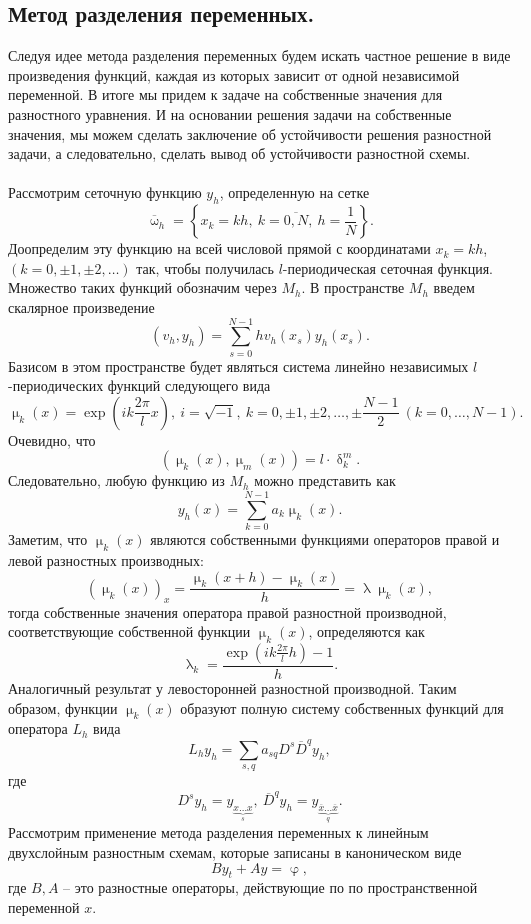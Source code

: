 \documentclass[a4paper, 12pt]{report}
\numberwithin{equation}{section}
\newcommand{\ol}{\overline}
\renewcommand{\delta}{\updelta}
\renewcommand{\varphi}{\upvarphi}
\renewcommand{\lambda}{\uplambda}
\renewcommand{\mu}{\upmu}
\renewcommand{\omega}{\upomega}
\begin{document}
 \subsection{Метод разделения переменных.}
 Следуя идее метода разделения переменных будем искать частное решение в виде произведения функций, каждая из которых зависит от одной независимой переменной. В итоге мы придем к задаче на собственные значения для разностного уравнения. И на основании решения задачи на собственные значения, мы можем сделать заключение об устойчивости решения разностной задачи, а следовательно, сделать вывод об устойчивости разностной схемы.\\\\
 Рассмотрим сеточную функцию $y_h$, определенную на сетке $$\ol \omega _h = \left\{x_k = kh,\ k = \ol{0,N},\ h = \dfrac 1N\right\}.$$
 Доопределим эту функцию на всей числовой прямой с координатами $x_k = kh$, $(k = 0, \pm 1, \pm 2,\ldots)$ так, чтобы получилась $l$-периодическая сеточная функция. Множество таких функций обозначим через $M_h$. В пространстве $M_h$ введем скалярное произведение
 $$(v_h, y_h) = \sum_{s=0}^{N-1} h v_h(x_s) y_h(x_s).$$
 Базисом в этом пространстве будет являться система линейно независимых $l$-периодических функций следующего вида
 $$\mu_k(x)=\exp\left(ik \frac {2\pi}lx\right),\ i = \sqrt{-1},\ k=0,\pm1,\pm2,\ldots,\pm \dfrac {N-1}{2}\ (k=0,\ldots,N-1).$$
 Очевидно, что $$(\mu_k(x), \mu_m(x)) = l\cdot \delta ^m_k.$$
 Следовательно, любую функцию из $M_h$ можно представить как
 $$y_h(x) = \sum_{k=0}^{N-1} a_k \mu_k(x).$$
 Заметим, что $\mu_k(x)$ являются собственными функциями операторов правой и левой разностных производных:
 $$(\mu_k(x))_x = \dfrac{\mu_k(x+h) - \mu_k(x)}{h} = \lambda \mu_k(x),$$
 тогда собственные значения оператора правой разностной производной, соответствующие собственной функции $\mu_k(x)$, определяются как
 $$\lambda_k = \dfrac{\exp\left(ik \frac {2\pi}lh\right) - 1}{h}.$$
 Аналогичный результат у левосторонней разностной производной. Таким образом, функции $\mu_k(x)$ образуют полную систему собственных функций для оператора
 $L_h$ вида $$L_h y_h = \sum_{s,q} a_{sq}D^s \ol D^q y_h,$$
 где
 $$D^s y_h = y_{\underbrace{x\ldots x}_s},\ \ol D^q y_h = y_{\underbrace{\ol x\ldots \ol x}_q}.$$
 Рассмотрим применение метода разделения переменных к линейным двухслойным разностным схемам, которые записаны в каноническом виде
 \begin{equation}
	 	By_t + A y = \varphi,
 \end{equation}
 где $B, A$ -- это разностные операторы, действующие по по пространственной переменной $x$.\\\\
\end{document}
